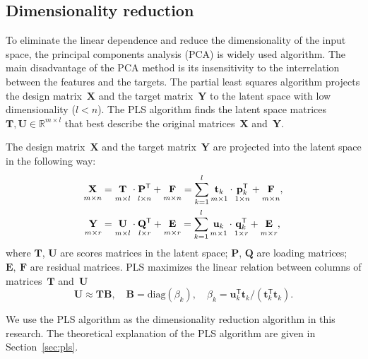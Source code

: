 \documentclass[12pt,oneside]{article}
\theoremstyle{definition}
\newcommand{\bY}{\mathbf{Y}}
\newcommand{\bX}{\mathbf{X}}
\newcommand{\bu}{\mathbf{u}}
\newcommand{\bt}{\mathbf{t}}
\newcommand{\bp}{\mathbf{p}}
\newcommand{\bq}{\mathbf{q}}
\newcommand{\bP}{\mathbf{P}}
\newcommand{\bT}{\mathbf{T}}
\newcommand{\bB}{\mathbf{B}}
\newcommand{\bQ}{\mathbf{Q}}
\newcommand{\bE}{\mathbf{E}}
\newcommand{\bF}{\mathbf{F}}
\newcommand{\bU}{\mathbf{U}}
\newcommand{\T}{\mathsf{T}}
\begin{document}
 
 \subsection{Dimensionality reduction}

To eliminate the linear dependence and reduce the dimensionality of the input space, the principal components analysis (PCA) is widely used algorithm. 
The main disadvantage of the PCA method is its insensitivity to the interrelation between the features and the targets.
The partial least squares algorithm projects the design matrix~$\bX$ and the target matrix~$\bY$ to the latent space with low dimensionality ($l < n$).
The PLS algorithm finds the latent space matrices $\bT, \bU \in \mathbb{R}^{m \times l}$ that best describe the original matrices~$\bX$ and~$\bY$.

The design matrix~$\bX$ and the target matrix~$\bY$ are projected into the latent space in the following way:
\begin{align}
\label{eq:PLS_X}
\underset{m \times n}{\vphantom{\bQ}\bX} 
&= \underset{m \times l}{\vphantom{\bQ}\bT} \cdot \underset{l \times n}{\vphantom{\bQ}\bP^{\T}} + \underset{m \times n}{\vphantom{\bQ}\bF} 
= \sum_{k=1}^l \underset{m \times 1}{\vphantom{\bp_k^{\T}}\bt_k} \cdot \underset{1 \times n}{\bp_k^{\T}} + \underset{m \times n}{\vphantom{\bp_k^{\T}}\bF},\\
\label{eq:PLS_Y}
\underset{m \times r}{\vphantom{\bQ}\bY} 
&= \underset{m \times l}{\vphantom{\bQ}\bU} \cdot \underset{l \times r}{\bQ^{\T}} + \underset{m \times r}{\vphantom{\bQ}\bE}
=  \sum_{k=1}^l  \underset{m \times 1}{\vphantom{\bq_k^{\T}}\bu_k} \cdot \underset{1 \times r}{\bq_k^{\T}} +  \underset{m \times r}{\vphantom{\bq_k^{\T}}\bE},
\end{align}
where $\bT$, $\bU$ are scores matrices in the latent space; $\bP$, $\bQ$ are loading matrices; $\bE,\ \bF$ are residual matrices. PLS maximizes the linear relation between columns of matrices~$\bT$ and~$\bU$
\begin{equation}
\bU \approx \bT \bB, \quad \bB = \text{diag}(\beta_k), \quad \beta_k = \bu_k^{\T}\bt_k / (\bt_k^{\T}\bt_k).
\end{equation}

We use the PLS algorithm as the dimensionality reduction algorithm in this research.
The theoretical explanation of the PLS algorithm are given in Section~\ref{sec:pls}.

\end{document}
